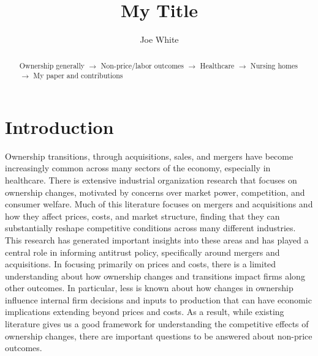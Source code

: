 \documentclass[preprint,authoryear]{elsarticle}
\begin{document}
\begin{frontmatter}
\title{My Title}
\author[miami]{Joe White}


\address[miami]{Department of Economics, Miami University, Oxford, OH, USA}


\begin{abstract}

Ownership generally $\rightarrow$ Non-price/labor outcomes $\rightarrow$ Healthcare $\rightarrow$ Nursing homes $\rightarrow$ My paper and contributions

\end{abstract}

\end{frontmatter}

\section{Introduction}

Ownership transitions, through acquisitions, sales, and mergers have become increasingly common across many sectors of the economy, especially in healthcare. There is extensive industrial organization research that focuses on ownership changes, motivated by concerns over market power, competition, and consumer welfare. Much of this literature focuses on mergers and acquisitions and how they affect prices, costs, and market structure, finding that they can substantially reshape competitive conditions across many different industries. This research has generated important insights into these areas and has played a central role in informing antitrust policy, specifically around mergers and acquisitions. In focusing primarily on prices and costs, there is a limited understanding about how ownership changes and transitions impact firms along other outcomes. In particular, less is known about how changes in ownership influence internal firm decisions and inputs to production that can have economic implications extending beyond prices and costs. As a result, while existing literature gives us a good framework for understanding the competitive effects of ownership changes, there are important questions to be answered about non-price outcomes. \\
\end{document}
